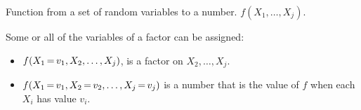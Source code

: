 \documentclass[12pt]{beamer} %
\newcommand{\figdir}{../../figures/ch06}
\begin{document}


\begin{slide}
Function from
a set of random variables to a number. $f(X_1,\ldots,X_j)$.

Some or all of the variables of a factor can be assigned:
\begin{itemize}
\item
$f(X_1{\,{=}\,}v_1,X_2,\ldots,X_j)$,
is a factor on
$X_2,\ldots,X_j$.
\item 
$f(X_1{\,{=}\,}v_1,X_2{\,{=}\,}v_2,\ldots,X_j{\,{=}\,}v_j)$  is a number that is the value of $f$ when each
$X_i$ has value $v_i$. 
\end{itemize}
\end{slide}
\end{document}
